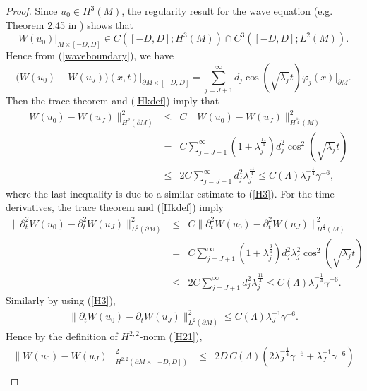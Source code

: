 \documentclass[11pt,letterpaper]{amsart}
\numberwithin{equation}{section}
\theoremstyle{definition}
\theoremstyle{plain}
\theoremstyle{definition}
\theoremstyle{plain}
\theoremstyle{definition}
\theoremstyle{plain}
\begin{document}
\begin{proof}
Since $u_0\in H^3(M)$, the regularity result for the wave equation (e.g. Theorem 2.45 in \cite{KKL}) shows that
$$W(u_0)\big|_{M\times [-D,D]} \in C([-D,D];H^3(M))\cap C^3([-D,D];L^2(M)).$$
Hence from (\ref{waveboundary}), we have
$$\big(W(u_0)-W(u_{J})\big)(x,t) \big|_{\partial M\times [-D,D]}=\sum_{j=J+1}^{\infty} d_j\cos(\sqrt{\lambda_j}t)\varphi_j(x)|_{\partial M}.$$
Then the trace theorem and (\ref{Hkdef}) imply that
\begin{eqnarray*}
\|W(u_0)-W(u_{J})\|^2_{H^{2}(\partial M)} &\leqslant& C\|W(u_0)-W(u_{J})\|^2_{H^{\frac{11}{4}}(M)} \\
&=& C\sum_{j=J+1}^{\infty}(1+\lambda_j^{\frac{11}{4}})d_j^2\cos^2(\sqrt{\lambda_j}t) \\
&\leqslant& 2C\sum_{j=J+1}^{\infty} d_j^2 \lambda_j^{\frac{11}{4}}\leqslant C(\Lambda)\lambda_{J}^{-\frac{1}{4}}\gamma^{-6},
\end{eqnarray*}
where the last inequality is due to a similar estimate to (\ref{H3}).
For the time derivatives, the trace theorem and (\ref{Hkdef}) imply
\begin{eqnarray*}
\|\partial_t^2 W(u_0)-\partial_t^2 W(u_{J})\|^2_{L^2(\partial M)} &\leqslant& C \|\partial_t^2 W(u_0)-\partial_t^2 W(u_{J})\|^2_{H^{\frac{3}{4}}(M)} \\
&=& C\sum_{j=J+1}^{\infty}(1+\lambda_j^{\frac{3}{4}})d_j^2\lambda_j^2 \cos^2(\sqrt{\lambda_j}t) \\
&\leqslant& 2C\sum_{j=J+1}^{\infty}d_j^2\lambda_j^{\frac{11}{4}} \leqslant C(\Lambda)\lambda_{J}^{-\frac{1}{4}}\gamma^{-6}.
\end{eqnarray*}
Similarly by using (\ref{H3}),
\begin{eqnarray*}
\|\partial_t W(u_0)-\partial_t W(u_{J})\|^2_{L^2(\partial M)} \leqslant C(\Lambda)\lambda_{J}^{-1}\gamma^{-6}.
\end{eqnarray*}
Hence by the definition of $H^{2,2}$-norm (\ref{H21}),
\begin{eqnarray*}
\|W(u_0)-W(u_{J})\|^2_{H^{2,2}(\partial M\times [-D,D])} &\leqslant& 2D\,C(\Lambda)(2\lambda_{J}^{-\frac{1}{4}}\gamma^{-6}+\lambda_{J}^{-1}\gamma^{-6}) \\

\end{eqnarray*}
\end{proof}
\end{document}
